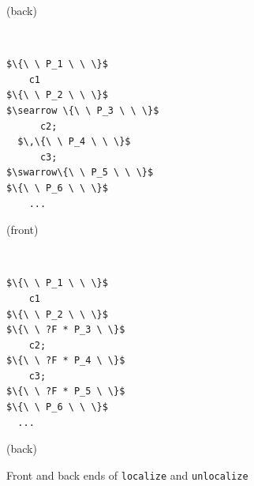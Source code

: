 \documentclass[acmsmall,screen]{acmart}  %
\newcommand{\li}[1]{{\texttt{\small #1}}} %
\providecommand{\DIFaddbeginFL}{} %
\providecommand{\DIFaddendFL}{} %
\providecommand{\DIFdelbeginFL}{} %
\providecommand{\DIFdelendFL}{} %
\newcommand{\DIFscaledelfig}{0.5}
\newlength{\DIFdelgraphicswidth} %
\newlength{\DIFdelgraphicsheight} %
\newcommand{\DIFaddincludegraphics}[2][]{{\color{blue}\fbox{\DIFOincludegraphics[#1]{#2}}}} %
\newcommand{\DIFdelincludegraphics}[2][]{%
\sbox{\DIFdelgraphicsbox}{\DIFOincludegraphics[#1]{#2}}%
\settoboxwidth{\DIFdelgraphicswidth}{\DIFdelgraphicsbox} %
\settoboxtotalheight{\DIFdelgraphicsheight}{\DIFdelgraphicsbox} %
\scalebox{\DIFscaledelfig}{%
\parbox[b]{\DIFdelgraphicswidth}{\usebox{\DIFdelgraphicsbox}\\[-\baselineskip] \rule{\DIFdelgraphicswidth}{0em}}\llap{\resizebox{\DIFdelgraphicswidth}{\DIFdelgraphicsheight}{%
\setlength{\unitlength}{\DIFdelgraphicswidth}%
\begin{picture}(1,1)%
\thicklines\linethickness{2pt} %
{\color[rgb]{1,0,0}\put(0,0){\framebox(1,1){}}}%
{\color[rgb]{1,0,0}\put(0,0){\line( 1,1){1}}}%
{\color[rgb]{1,0,0}\put(0,1){\line(1,-1){1}}}%
\end{picture}%
}\hspace*{3pt}}} %
} %
\DeclareRobustCommand{\DIFaddbeginFL}{\DIFOaddbeginFL \let\includegraphics\DIFaddincludegraphics} %
\DeclareRobustCommand{\DIFaddendFL}{\DIFOaddendFL \let\includegraphics\DIFOincludegraphics} %
\DeclareRobustCommand{\DIFdelbeginFL}{\DIFOdelbeginFL \let\includegraphics\DIFdelincludegraphics} %
\DeclareRobustCommand{\DIFdelendFL}{\DIFOaddendFL \let\includegraphics\DIFOincludegraphics} %
\begin{document}
\begin{figure}
\begin{minipage}{.15\textwidth}
\begin{lstlisting}[numbers=none, basicstyle=\linespread{0.8}\normalfont\footnotesize\tt]
\end{lstlisting}
\DIFaddendFL \centerline{\footnotesize(back)}
\end{minipage} \vline \DIFaddbeginFL \vline \DIFaddendFL ~
\begin{minipage}{.15\textwidth}
\DIFdelbeginFL %
\DIFdelendFL \DIFaddbeginFL \begin{lstlisting}[numbers=none, basicstyle=\linespread{0.8}\normalfont\footnotesize\tt]
$\{\ \ P_1 \ \ \}$
    c1
$\{\ \ P_2 \ \ \}$
$\searrow \{\ \ P_3 \ \ \}$
      c2;
  $\,\{\ \ P_4 \ \ \}$
      c3;
$\swarrow\{\ \ P_5 \ \ \}$
$\{\ \ P_6 \ \ \}$
    ...
\end{lstlisting}
\DIFaddendFL \centerline{\footnotesize(front)}
\end{minipage} \vline ~
\begin{minipage}{.15\textwidth}
\DIFdelbeginFL %
\DIFdelendFL \DIFaddbeginFL \begin{lstlisting}[numbers=none, basicstyle=\linespread{0.8}\normalfont\footnotesize\tt]
$\{\ \ P_1 \ \ \}$
    c1
$\{\ \ P_2 \ \ \}$
$\{\ \ ?F * P_3 \ \}$
    c2;
$\{\ \ ?F * P_4 \ \}$
    c3;
$\{\ \ ?F * P_5 \ \}$
$\{\ \ P_6 \ \ \}$
  ...
\end{lstlisting}
\DIFaddendFL \centerline{\footnotesize(back)}
\end{minipage}
\caption{Front and back ends of \li{localize} and \li{unlocalize}}
\label{figure:backend}
\end{figure}
\end{document}
